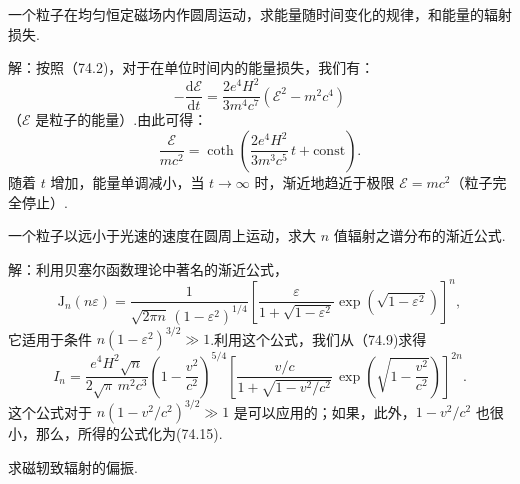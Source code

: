 \begin{xiti}

\quad 一个粒子在均匀恒定磁场内作圆周运动，求能量随时间变化的规律，和能量的辐射损失.

解：按照（74.2)，对于在单位时间内的能量损失，我们有：
\begin{equation*}
  -\frac{\mathrm{d}\mathcal{E}}{\mathrm{d}t}
  =\frac{2e^4H^2}{3m^4c^7}\left(\mathcal{E}^2-m^2c^4\right)
\end{equation*}
（$\mathcal{E}$ 是粒子的能量）.由此可得：
\begin{equation*}
  \frac{\mathcal{E}}{mc^2}
  =\coth\left(\frac{2e^4H^2}{3m^3c^5}\,t+\mathrm{const}\right).
\end{equation*}
随着 $t$ 增加，能量单调减小，当 $t\to\infty$ 时，渐近地趋近于极限 $\mathcal{E}=mc^2$（粒子完全停止）.

\quad 一个粒子以远小于光速的速度在圆周上运动，求大 $n$ 值辐射之谱分布的渐近公式.

解：利用贝塞尔函数理论中著名的渐近公式，
\begin{equation*}
  \mathrm{J}_n(n\varepsilon)=\frac{1}{\sqrt{2\pi n}\,(1-\varepsilon^2)^{1/4}}
  \left[\frac{\varepsilon}{1+\sqrt{1-\varepsilon^2}}
  \exp\!\left(\sqrt{1-\varepsilon^2}\right)\right]^{\!n},
\end{equation*}
它适用于条件 $n(1-\varepsilon^2)^{3/2}\gg 1$.利用这个公式，我们从（74.9)求得
\begin{equation*}
  I_n=\frac{e^4H^2\sqrt{n}}{2\sqrt{\pi}\,m^2c^3}\left(1-\frac{v^2}{c^2}\right)^{\!5/4}
  \left[\frac{v/c}{1+\sqrt{1-v^2/c^2}}\,
  \exp\!\left(\sqrt{1-\frac{v^2}{c^2}}\right)\right]^{\!2n}.
\end{equation*}
这个公式对于 $n(1-v^2/c^2)^{3/2}\gg 1$ 是可以应用的；如果，此外，$1-v^2/c^2$ 也很小，那么，所得的公式化为(74.15).

\quad 求磁轫致辐射的偏振.


\end{xiti}
